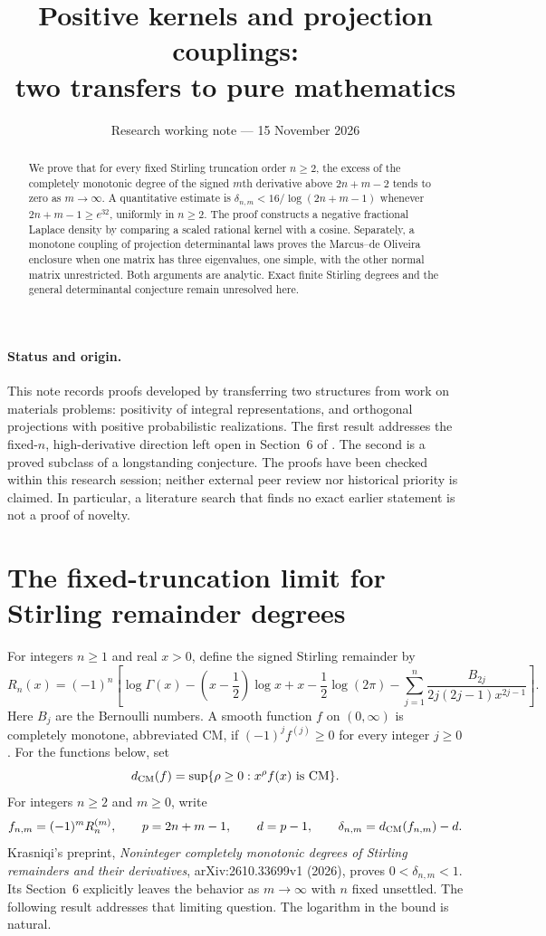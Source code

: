 \documentclass[11pt,a4paper]{article}
\title{Positive kernels and projection couplings:\\two transfers to pure mathematics}
\author{}
\date{Research working note --- 15 November 2026}
\theoremstyle{remark}
\begin{document}
\maketitle
\begin{abstract}
We prove that for every fixed Stirling truncation order $n\ge2$, the
excess of the completely monotonic degree of the signed $m$th derivative
above $2n+m-2$ tends to zero as $m\to\infty$. A quantitative estimate
is $\delta_{n,m}<16/\log(2n+m-1)$ whenever $2n+m-1\ge e^{32}$,
uniformly in $n\ge2$. The proof constructs a negative fractional
Laplace density by comparing a scaled rational kernel with a cosine.
Separately, a monotone coupling of projection determinantal laws
proves the Marcus--de Oliveira enclosure when one matrix has three
eigenvalues, one simple, with the other normal matrix unrestricted.
Both arguments are analytic. Exact finite Stirling degrees and the
general determinantal conjecture remain unresolved here.
\end{abstract}

\paragraph{Status and origin.}
This note records proofs developed by transferring two structures from
work on materials problems: positivity of integral representations,
and orthogonal projections with positive probabilistic realizations.
The first result addresses the fixed-$n$, high-derivative direction
left open in Section~6 of \cite{krasniqi}. The second is a proved
subclass of a longstanding conjecture. The proofs have been checked
within this research session; neither external peer review nor
historical priority is claimed. In particular, a literature search
that finds no exact earlier statement is not a proof of novelty.

\section{The fixed-truncation limit for Stirling remainder degrees}

For integers $n\geq 1$ and real $x>0$, define the signed Stirling remainder by
\[
 R_n(x)=(-1)^n\left[\log\Gamma(x)-\left(x-\frac12\right)\log x+x
 -\frac12\log(2\pi)-\sum_{j=1}^{n}
 \frac{B_{2j}}{2j(2j-1)x^{2j-1}}\right].
\]
Here $B_j$ are the Bernoulli numbers. A smooth function $f$ on $(0,\infty)$
is completely monotone, abbreviated CM, if $(-1)^j f^{(j)}\geq0$ for every
integer $j\geq0$. For the functions below, set
\[
 d_{\rm CM}(f)=\sup\{\rho\geq0:x^\rho f(x)\text{ is CM}\}.
\]
For integers $n\geq2$ and $m\geq0$, write
\[
 f_{n,m}=(-1)^mR_n^{(m)},\qquad p=2n+m-1,\qquad d=p-1,
 \qquad \delta_{n,m}=d_{\rm CM}(f_{n,m})-d.
\]
Krasniqi's preprint, \emph{Noninteger completely monotonic degrees of
Stirling remainders and their derivatives}, arXiv:2610.33699v1 (2026),
proves $0<\delta_{n,m}<1$. Its Section~6 explicitly leaves the behavior
as $m\to\infty$ with $n$ fixed unsettled. The following result addresses
that limiting question. The logarithm in the bound is natural.
\end{document}
